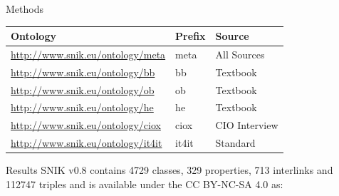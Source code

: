\documentclass[portrait,final,a0paper,fontscale=0.310]{imiseposter}
\begin{document}
\begin{poster}
\begin{posterbox}[name=methods,below=background]{Methods}
\begin{center}
\begin{tabular*}{0.96\columnwidth}{lll}
\toprule
\textbf{Ontology}				&\textbf{Prefix}&\textbf{Source}\\
\midrule
\url{http://www.snik.eu/ontology/meta}		&meta		&All Sources\\
\url{http://www.snik.eu/ontology/bb}		&bb		&Textbook~\cite{bb}\\
\url{http://www.snik.eu/ontology/ob}		&ob		&Textbook~\cite{ob}\\
\url{http://www.snik.eu/ontology/he}		&he		&Textbook~\cite{he}\\
\url{http://www.snik.eu/ontology/ciox}		&ciox		&CIO Interview\\
\url{http://www.snik.eu/ontology/it4it}		&it4it		&Standard~\cite{it4it}\\
\bottomrule
\end{tabular*}
\end{center}

\end{posterbox}
\begin{posterbox}[name=results,column=1]{Results}
SNIK v0.8 contains \num{4729} classes, \num{329} properties, \num{713} interlinks and \num{112747} triples and is available under the CC BY-NC-SA 4.0 as:

\end{posterbox}
\end{poster}
\end{document}
